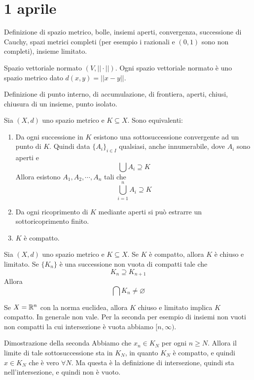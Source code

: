 \documentclass[a4paper]{article}
\begin{document}
\section{1 aprile}

Definizione di spazio metrico, bolle, insiemi aperti, convergenza, successione di Cauchy,
spazi metrici completi (per esempio i razionali e \((0,1)\) sono non completi),
insieme limitato.

Spazio vettoriale normato \((V, ||\cdot||)\). Ogni spazio vettoriale normato
è uno spazio metrico dato \(d(x,y) = ||x-y||\).

Definizione di punto interno, di accumulazione, di frontiera, aperti,
chiusi, chiusura di un insieme, punto isolato.

\begin{snippetproposition}{}
    Sia \((X, d)\) uno spazio metrico e \(K \subseteq X\).
    Sono equivalenti:
    \begin{enumerate}
        \item Da ogni successione in \(K\) esistono una sottosuccessione convergente ad un punto di \(K\).
        Quindi data \(\{A_i\}_{i\in I}\) qualsiasi, anche innumerabile, dove \(A_i\) sono aperti e
        \[
            \bigcup A_i \supseteq K
        \]
        Allora esistono \(A_1, A_2, \cdots, A_n\) tali che
        \[
            \bigcup_{i=1}^n A_i \supseteq K
        \]
        \item Da ogni ricoprimento di \(K\) mediante aperti si può estrarre
        un sottoricoprimento finito.
        \item \(K\) è compatto.
    \end{enumerate}
\end{snippetproposition}

\begin{snippetproposition}{}
    Sia \((X, d)\) uno spazio metrico e \(K \subseteq X\).
    Se \(K\) è compatto, allora \(K\) è chiuso e limitato.
    Se \(\{K_n\}\) è una successione non vuota di compatti tale che
    \[
        K_n \supseteq K_{n+1}
    \]
    Allora
    \[
        \bigcap K_n \neq \varnothing
    \]
\end{snippetproposition}

Se \(X = \mathbb{R}^n\) con la norma euclidea, allora \(K\) chiuso e limitato
implica \(K\) compatto. In generale non vale.
Per la seconda per esempio di insiemi non vuoti non compatti la cui intersezione è vuota abbiamo
\([n, \infty)\).

\begin{snippetproof}{Dimostrazione della seconda}
    Abbiamo che \(x_n \in K_N\) per ogni \(n \geq N\).
    Allora il limite di tale sottosuccessione sta in \(K_N\), in quanto \(K_N\) è compatto,
    e quindi \(x\in K_N\) che è vero \(\forall N\). Ma questa è la definizione di intersezione,
    quindi sta nell'intersezione, e quindi non è vuoto.
\end{snippetproof}
\end{document}
